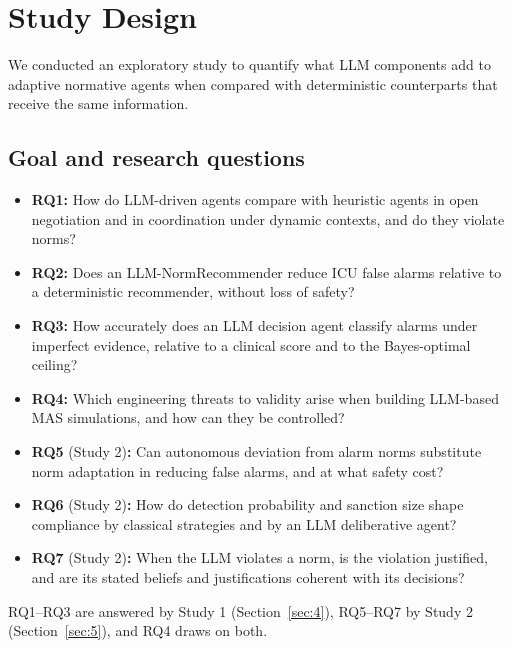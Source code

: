\documentclass{ieeeaccess}
\begin{document}
\section{Study Design}\label{sec:3}
We conducted an exploratory study to quantify what LLM components add to adaptive normative agents when compared with deterministic counterparts that receive the same information.

\subsection{Goal and research questions}\label{sec:3.1}
\begin{itemize}
\item \textbf{RQ1:} How do LLM-driven agents compare with heuristic agents in open negotiation and in coordination under dynamic contexts, and do they violate norms?
\item \textbf{RQ2:} Does an LLM-NormRecommender reduce ICU false alarms relative to a deterministic recommender, without loss of safety?
\item \textbf{RQ3:} How accurately does an LLM decision agent classify alarms under imperfect evidence, relative to a clinical score and to the Bayes-optimal ceiling?
\item \textbf{RQ4:} Which engineering threats to validity arise when building LLM-based MAS simulations, and how can they be controlled?
\item \textbf{RQ5} (Study 2)\textbf{:} Can autonomous deviation from alarm norms substitute norm adaptation in reducing false alarms, and at what safety cost?
\item \textbf{RQ6} (Study 2)\textbf{:} How do detection probability and sanction size shape compliance by classical strategies and by an LLM deliberative agent?
\item \textbf{RQ7} (Study 2)\textbf{:} When the LLM violates a norm, is the violation justified, and are its stated beliefs and justifications coherent with its decisions?
\end{itemize}

RQ1–RQ3 are answered by Study 1 (Section~\ref{sec:4}), RQ5–RQ7 by Study 2 (Section~\ref{sec:5}), and RQ4 draws on both.
\end{document}

